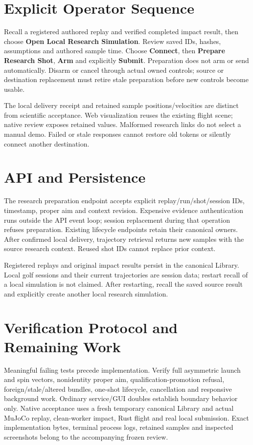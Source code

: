 \documentclass[11pt]{article}
\begin{document}
\newpage
\section*{Explicit Operator Sequence}
Recall a registered authored replay and verified completed impact result, then
choose \textbf{Open Local Research Simulation}. Review saved IDs, hashes,
assumptions and authored sample time. Choose \textbf{Connect}, then
\textbf{Prepare Research Shot}, \textbf{Arm} and explicitly \textbf{Submit}.
Preparation does not arm or send automatically. Disarm or cancel through actual
owned controls; source or destination replacement must retire stale preparation
before new controls become usable.

The local delivery receipt and retained sample positions/velocities are distinct
from scientific acceptance. Web visualization reuses the existing flight scene;
native review exposes retained values. Malformed research links do not select a
manual demo. Failed or stale responses cannot restore old tokens or silently
connect another destination.

\section*{API and Persistence}
The research preparation endpoint accepts explicit replay/run/shot/session IDs,
timestamp, proper aim and context revision. Expensive evidence authentication
runs outside the API event loop; session replacement during that operation
refuses preparation. Existing lifecycle endpoints retain their canonical owners.
After confirmed local delivery, trajectory retrieval returns new samples with
the source research context. Reused shot IDs cannot replace prior context.

Registered replays and original impact results persist in the canonical Library.
Local golf sessions and their current trajectories are session data; restart
recall of a local simulation is not claimed. After restarting, recall the saved
source result and explicitly create another local research simulation.

\section*{Verification Protocol and Remaining Work}
Meaningful failing tests precede implementation. Verify full asymmetric launch
and spin vectors, nonidentity proper aim, qualification-promotion refusal,
foreign/stale/altered bundles, one-shot lifecycle, cancellation and responsive
background work. Ordinary service/GUI doubles establish boundary behavior only.
Native acceptance uses a fresh temporary canonical Library and actual MuJoCo
replay, clean-worker impact, Rust flight and real local submission. Exact
implementation bytes, terminal process logs, retained samples and inspected
screenshots belong to the accompanying frozen review.
\end{document}
